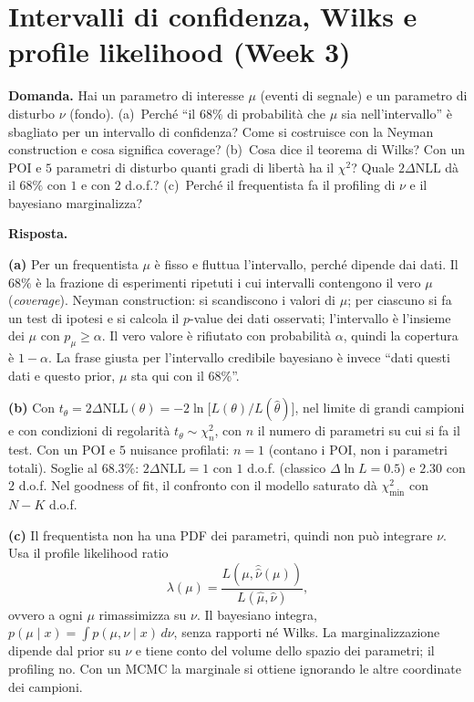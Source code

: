 \documentclass[11pt,a4paper]{article}
\newcommand{\Dom}[1]{\par\medskip\noindent\textbf{Domanda.} #1\par\nopagebreak}
\newcommand{\Ris}[1]{\noindent\textbf{Risposta.}\par\nopagebreak #1}
\begin{document}
\section{Intervalli di confidenza, Wilks e profile likelihood (Week 3)}

\Dom{Hai un parametro di interesse $\mu$ (eventi di segnale) e un parametro di disturbo $\nu$ (fondo).
(a)~Perch\'e ``il $68\%$ di probabilit\`a che $\mu$ sia nell'intervallo'' \`e sbagliato per un intervallo di confidenza? Come si costruisce con la Neyman construction e cosa significa coverage?
(b)~Cosa dice il teorema di Wilks? Con un POI e $5$ parametri di disturbo quanti gradi di libert\`a ha il $\chi^2$? Quale $2\Delta\mathrm{NLL}$ d\`a il $68\%$ con $1$ e con $2$ d.o.f.?
(c)~Perch\'e il frequentista fa il profiling di $\nu$ e il bayesiano marginalizza?}

\Ris{
\textbf{(a)} Per un frequentista $\mu$ \`e fisso e fluttua l'intervallo, perch\'e dipende dai dati. Il $68\%$ \`e la frazione di esperimenti ripetuti i cui intervalli contengono il vero $\mu$ (\emph{coverage}).
Neyman construction: si scandiscono i valori di $\mu$; per ciascuno si fa un test di ipotesi e si calcola il $p$-value dei dati osservati; l'intervallo \`e l'insieme dei $\mu$ con $p_\mu\ge\alpha$. Il vero valore \`e rifiutato con probabilit\`a $\alpha$, quindi la copertura \`e $1-\alpha$.
La frase giusta per l'intervallo credibile bayesiano \`e invece ``dati questi dati e questo prior, $\mu$ sta qui con il $68\%$''.

\textbf{(b)} Con $t_\theta=2\Delta\mathrm{NLL}(\theta)=-2\ln\bigl[L(\theta)/L(\hat\theta)\bigr]$, nel limite di grandi campioni e con condizioni di regolarit\`a $t_\theta\sim\chi^2_n$, con $n$ il numero di parametri su cui si fa il test.
Con un POI e $5$ nuisance profilati: $n=1$ (contano i POI, non i parametri totali).
Soglie al $68.3\%$: $2\Delta\mathrm{NLL}=1$ con $1$ d.o.f. (classico $\Delta\ln L=0.5$) e $2.30$ con $2$ d.o.f.
Nel goodness of fit, il confronto con il modello saturato d\`a $\chi^2_{\min}$ con $N-K$ d.o.f.

\textbf{(c)} Il frequentista non ha una PDF dei parametri, quindi non pu\`o integrare $\nu$. Usa il profile likelihood ratio
\[
\lambda(\mu)=\frac{L(\mu,\hat{\hat\nu}(\mu))}{L(\hat\mu,\hat\nu)},
\]
ovvero a ogni $\mu$ rimassimizza su $\nu$.
Il bayesiano integra, $p(\mu\mid x)=\int p(\mu,\nu\mid x)\,d\nu$, senza rapporti n\'e Wilks.
La marginalizzazione dipende dal prior su $\nu$ e tiene conto del volume dello spazio dei parametri; il profiling no.
Con un MCMC la marginale si ottiene ignorando le altre coordinate dei campioni.
}
\end{document}
